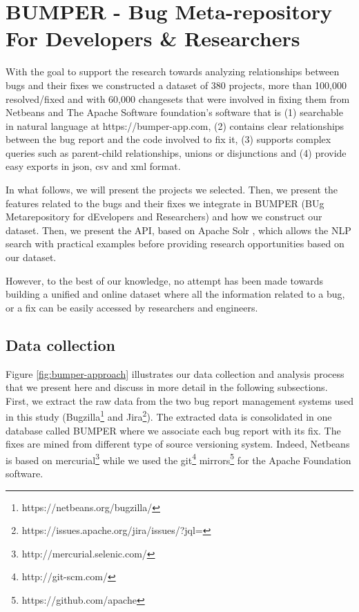 
\section{BUMPER - Bug Meta-repository For Developers \& Researchers\label{sec:BUMPER}}

With the goal to support the research towards analyzing relationships between bugs and their fixes we constructed a dataset of 380 projects, more than 100,000 resolved/fixed and with 60,000 changesets that were involved in fixing them from Netbeans and The Apache Software foundation's software that is (1) searchable in natural language at https://bumper-app.com, (2) contains clear relationships between the bug report and the code involved to fix it, (3) supports complex queries such as parent-child relationships, unions or disjunctions and (4) provide easy exports in json, csv and xml format.

In what follows, we will present the projects we selected. Then, we present the features related to the bugs and their fixes we integrate in BUMPER (BUg Metarepository for dEvelopers and Researchers) and how we construct our dataset. Then, we present the API, based on Apache Solr \cite{Nayrolles2014b}, which allows the NLP search with practical examples before providing research opportunities based on our dataset.


However, to the best of our knowledge, no attempt has been made towards building a unified and online dataset where all the information related to a bug, or a fix can be easily accessed by researchers and engineers.

\subsection{Data collection}


Figure \ref{fig:bumper-approach} illustrates our data collection and analysis process that we present here and discuss in more detail in the following subsections. First, we extract the raw data from the two bug report management systems used in this study (Bugzilla\footnote{https://netbeans.org/bugzilla/} and Jira\footnote{https://issues.apache.org/jira/issues/?jql=}). The extracted data is consolidated in one database called BUMPER where we associate each bug report with its fix. The fixes are mined from different type of source versioning system. Indeed, Netbeans is based on mercurial\footnote{ http://mercurial.selenic.com/} while we used the git\footnote{http://git-scm.com/} mirrors\footnote{https://github.com/apache} for the Apache Foundation software.

